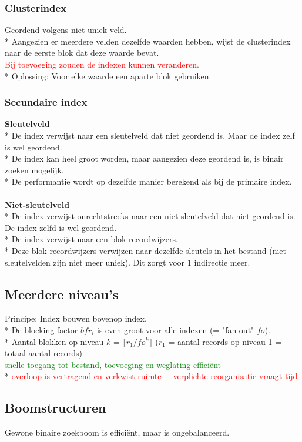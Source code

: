\documentclass[10pt]{article}
\begin{document}
\subsubsection{Clusterindex}
Geordend volgens niet-uniek veld.\\*
Aangezien er meerdere velden dezelfde waarden hebben, wijst de clusterindex naar de eerste blok dat deze waarde bevat.\\
\textcolor{red}{Bij toevoeging zouden de indexen kunnen veranderen.}\\*
Oplossing: Voor elke waarde een aparte blok gebruiken.
\subsubsection{Secundaire index}
\textbf{Sleutelveld}\\*
De index verwijst naar een sleutelveld dat niet geordend is. Maar de index zelf is wel geordend.\\*
De index kan heel groot worden, maar aangezien deze geordend is, is binair zoeken mogelijk.\\*
De performantie wordt op dezelfde manier berekend als bij de primaire index.\\\\
\textbf{Niet-sleutelveld}\\*
De index verwijst onrechtstreeks naar een niet-sleutelveld dat niet geordend is. De index zelfd is wel geordend.\\*
De index verwijst naar een blok recordwijzers.\\*
Deze blok recordwijzers verwijzen naar dezelfde sleutels in het bestand (niet-sleutelvelden zijn niet meer uniek). Dit zorgt voor 1 indirectie meer.
\subsection{Meerdere niveau's}
Principe: Index bouwen bovenop index.\\*
De blocking factor $bfr_i$ is even groot voor alle indexen (= "fan-out" $fo$).\\*
Aantal blokken op niveau $k$ = $\lceil r_1/fo^k \rceil$ ($r_1$ = aantal records op niveau 1 = totaal aantal records)\\
\textcolor{green}{snelle toegang tot bestand, toevoeging en weglating effici\"ent}\\*
\textcolor{red}{overloop is vertragend en verkwist ruimte + verplichte reorganisatie vraagt tijd}
\subsection{Boomstructuren}
Gewone binaire zoekboom is effici\"ent, maar is ongebalanceerd.
\end{document}
